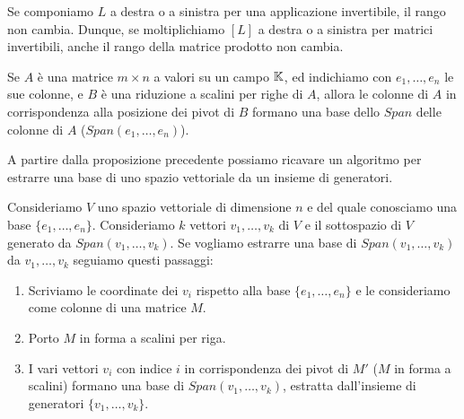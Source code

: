 \begin{observation}
	Se componiamo $L$ a destra o a sinistra per una	applicazione invertibile,
	il rango non cambia. Dunque, se moltiplichiamo $[L]$ a destra o a sinistra
	per matrici invertibili, anche il rango della matrice prodotto non cambia.
\end{observation}

\begin{proposition}
	Se $A$ è una matrice $m \times n$ a valori su un campo $\mathbb{K}$, ed
	indichiamo con $e_1, \dots, e_n$ le sue colonne, e $B$ è una riduzione
	a scalini per righe di $A$, allora le colonne di $A$ in corrispondenza alla
	posizione dei pivot di $B$ formano una base dello $Span$ delle colonne di $A$
	($Span(e_1, \dots, e_n)$).
\end{proposition}

\begin{observation}
	A partire dalla proposizione precedente possiamo ricavare un algoritmo per
	estrarre una base di uno spazio vettoriale da un insieme di generatori.

	Consideriamo $V$ uno spazio vettoriale di dimensione $n$ e del quale
	conosciamo una base $\{e_1, \dots, e_n\}$. Consideriamo $k$ vettori
	$v_1, \dots, v_k$ di $V$ e il sottospazio di $V$ generato da
	$Span(v_1, \dots, v_k)$. Se vogliamo estrarre una base di
	$Span(v_1, \dots, v_k)$ da $v_1, \dots, v_k$ seguiamo questi passaggi:
	\begin{enumerate}
		\item Scriviamo le coordinate dei $v_i$ rispetto alla base
		      $\{e_1, \dots, e_n\}$ e le	consideriamo come colonne di
		      una matrice $M$.
		\item Porto $M$ in forma a scalini per riga.
		\item I vari vettori $v_i$ con indice $i$ in corrispondenza dei pivot di $M'$
		      ($M$ in forma a scalini) formano una base di $Span(v_1, \dots, v_k)$,
		      estratta dall'insieme di generatori $\{v_1, \dots, v_k\}$.
	\end{enumerate}
\end{observation}